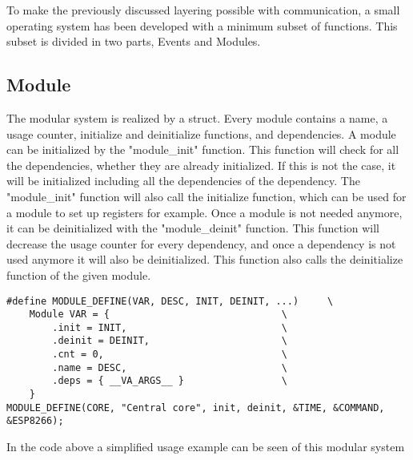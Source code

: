 To make the previously discussed layering possible with communication, a small operating system has been developed with a minimum subset of functions. This subset is divided in two parts, Events and Modules.
\subsection{Module}
The modular system is realized by a struct. Every module contains a name, a usage counter, initialize and deinitialize functions, and dependencies. A module can be initialized by the "module\_init" function. This function will check for all the dependencies, whether they are already initialized. If this is not the case, it will be initialized including all the dependencies of the dependency. The "module\_init" function will also call the initialize function, which can be used for a module to set up registers for example. Once a module is not needed anymore, it can be deinitialized with the "module\_deinit" function. This function will decrease the usage counter for every dependency, and once a dependency is not used anymore it will also be deinitialized. This function also calls the deinitialize function of the given module.

\begin{verbatim}
#define MODULE_DEFINE(VAR, DESC, INIT, DEINIT, ...)     \
	Module VAR = {                          	\
		.init = INIT,                           \
		.deinit = DEINIT,                       \
		.cnt = 0,                               \
		.name = DESC,                           \
		.deps = { __VA_ARGS__ }                 \
	} 
MODULE_DEFINE(CORE, "Central core", init, deinit, &TIME, &COMMAND, &ESP8266);
\end{verbatim}
In the code above a simplified usage example can be seen of this modular system

